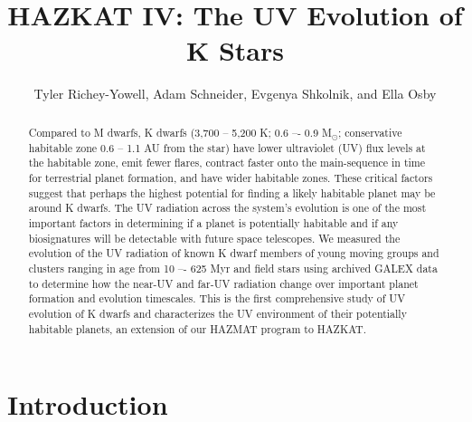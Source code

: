 \documentclass[twocolumn]{aastex62}
\begin{document}
\title{HAZKAT IV: The UV Evolution of K Stars}

\author{Tyler Richey-Yowell, Adam Schneider, Evgenya Shkolnik, and Ella Osby}

\begin{abstract}

Compared to M dwarfs, K dwarfs (3,700 -- 5,200 K; 0.6 –- 0.9 M$_{\odot}$; conservative habitable zone 0.6 -- 1.1 AU from the star) have lower ultraviolet (UV) flux levels at the habitable zone, emit fewer flares, contract faster onto the main-sequence in time for terrestrial planet formation, and have wider habitable zones. These critical factors suggest that perhaps the highest potential for finding a likely habitable planet may be around K dwarfs. The UV radiation across the system’s evolution is one of the most important factors in determining if a planet is potentially habitable and if any biosignatures will be detectable with future space telescopes. We measured the evolution of the UV radiation of known K dwarf members of young moving groups and clusters ranging in age from 10 –- 625 Myr and field stars using archived GALEX data to determine how the near-UV and far-UV radiation change over important planet formation and evolution timescales. This is the first comprehensive study of UV evolution of K dwarfs and characterizes the UV environment of their potentially habitable planets, an extension of our HAZMAT program to HAZKAT.

\end{abstract}


\section{Introduction}\label{sec:intro}
\end{document}
